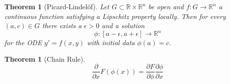 \documentclass[12pt,a4paper]{article}
\newtheorem{thm}[definition]{Theorem}
\newcommand{\Rn}{\mathbb{R}^n}
\begin{document}
\begin{thm}[Picard-Lindelöf]
Let $G\subset \mathbb{R}\times\Rn$ be open and $f:G\rightarrow \Rn$ a continuous function satisfying a Lipschitz property locally. Then for every $(a,c)\in G$ there exists a $\epsilon >0$ and a solution
\begin{equation}
\phi:[a-\epsilon,a+\epsilon]\rightarrow\Rn
\end{equation}
for the ODE $y'=f(x,y)$ with initial data $\phi(a)=c$.
\end{thm}

\begin{thm}[Chain Rule]
\begin{equation}
\frac{\partial}{\partial x} F(\phi(x)) = \frac{\partial F}{\partial \phi} \frac{\partial \phi}{\partial x}
\end{equation}
\end{thm}
\end{document}

